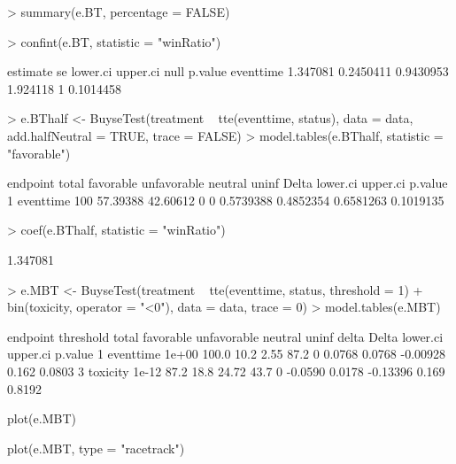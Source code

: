 \documentclass[12pt]{article}
\theoremstyle{definition}
\begin{document}
\begin{Rcode}
> summary(e.BT, percentage = FALSE)
\end{Rcode}

\begin{Rcode}
> confint(e.BT, statistic = "winRatio")
\end{Rcode}
\begin{Routput}
          estimate        se  lower.ci upper.ci null   p.value
eventtime 1.347081 0.2450411 0.9430953 1.924118    1 0.1014458
\end{Routput}

\begin{Rcode}
> e.BThalf <- BuyseTest(treatment ~ tte(eventtime, status),
                        data = data, add.halfNeutral = TRUE, trace = FALSE)
> model.tables(e.BThalf, statistic = "favorable")
\end{Rcode}
\begin{Routput}
   endpoint total favorable unfavorable neutral uninf     Delta  lower.ci  upper.ci   p.value
1 eventtime   100  57.39388    42.60612       0     0 0.5739388 0.4852354 0.6581263 0.1019135
\end{Routput}

\begin{Rcode}
> coef(e.BThalf, statistic = "winRatio")
\end{Rcode}
\begin{Routput}
[1] 1.347081
\end{Routput}

\clearpage

\begin{Rcode}
> e.MBT <- BuyseTest(treatment ~ tte(eventtime, status, threshold = 1) + bin(toxicity, operator = "<0"),
                     data = data, trace = 0)
> model.tables(e.MBT)
\end{Rcode}
\begin{Routput}
   endpoint threshold total favorable unfavorable neutral uninf   delta  Delta lower.ci upper.ci p.value
1 eventtime     1e+00 100.0      10.2        2.55    87.2     0  0.0768 0.0768 -0.00928    0.162  0.0803
3  toxicity     1e-12  87.2      18.8       24.72    43.7     0 -0.0590 0.0178 -0.13396    0.169  0.8192
\end{Routput}

\begin{Rcode}
plot(e.MBT)
\end{Rcode}

\begin{Rcode}
plot(e.MBT, type = "racetrack")
\end{Rcode}
\end{document}
